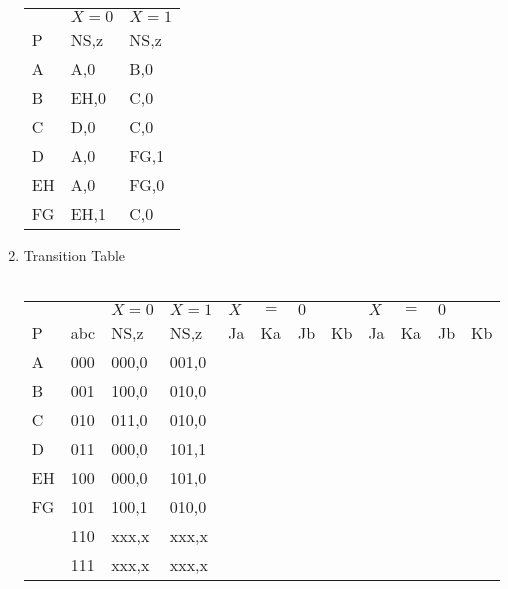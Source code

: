 \documentclass[12pt]{article}
\begin{document}
\begin{enumerate}
    \begin{tabular}{ >{\centering}p{} p{} p{}}

          & $X=0$ & $X=1$ \\ 
        P  & NS,z & NS,z  \\ \hline

        A  & A,0  & B,0  \\
        B  & EH,0 & C,0  \\
        C  & D,0  & C,0  \\
        D  & A,0  & FG,1 \\
        EH & A,0  & FG,0 \\
        FG & EH,1 & C,0  \\

    \end{tabular}

    \pagebreak

    \item Transition Table \\ \\

    \begin{tabular}{ l l l l | l l l l | l l l l}

         &  & $X=0$ & $X=1$ & $X$ & $=$ & $0$ & & $X$ & $=$ & $0$ \\ 
        P & abc  & NS,z & NS,z & Ja & Ka & Jb & Kb & Ja & Ka & Jb & Kb \\ \hline

        A  & 000 & 000,0 & 001,0 \\
        B  & 001 & 100,0 & 010,0 \\
        C  & 010 & 011,0 & 010,0 \\
        D  & 011 & 000,0 & 101,1 \\
        EH & 100 & 000,0 & 101,0 \\
        FG & 101 & 100,1 & 010,0 \\
           & 110 & xxx,x & xxx,x \\
           & 111 & xxx,x & xxx,x 

    \end{tabular}

    \vspace{2cm}


\end{enumerate}
\end{document}
